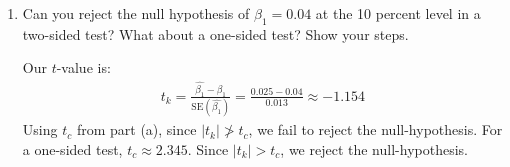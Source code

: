 \documentclass[11pt,twoside,openany]{memoir}
\begin{document}
\begin{question}
\begin{enumerate}[label = (\alph*),itemsep=1pt,topsep=3pt]
                \item Can you reject the null hypothesis of $\beta_1 = 0.04$ at the 10 percent level in a two-sided test? What about a one-sided test? Show your steps.
                    {\color{blue} \begin{solution}
                        Our $t$-value is:
                            \begin{equation*}
                            \begin{split}
                                t_k = \frac{\widehat{\beta_1} - \beta_1}{\text{SE}(\widehat{\beta_1})} = \frac{0.025 - 0.04}{0.013} \approx -1.154
                            \end{split}
                            \end{equation*}
                        Using $t_c$ from part (a), since $|t_k| \not >  t_c$, we fail to reject the null-hypothesis. For a one-sided test, $t_c \approx 2.345$. Since $|t_k| > t_c$, we reject the null-hypothesis.
                    \end{solution}}
            \end{enumerate}
    \end{question}
\end{document}
